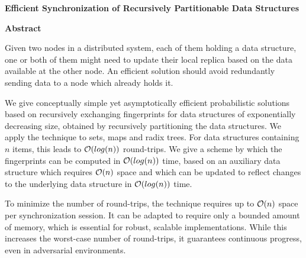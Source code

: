 
\thispagestyle{plain}
\begin{center}
    \Large
    \textbf{Efficient Synchronization of Recursively Partitionable Data Structures}
       
    \vspace{0.9cm}
    \textbf{Abstract}
\end{center}

Given two nodes in a distributed system, each of them holding a data structure, one or both of them might need to update their local replica based on the data available at the other node.
An efficient solution should avoid redundantly sending data to a node which already holds it.

We give conceptually simple yet asymptotically efficient probabilistic solutions based on recursively exchanging fingerprints for data structures of exponentially decreasing size, obtained by recursively partitioning the data structures.
We apply the technique to sets, maps and radix trees.
For data structures containing $n$ items, this leads to $\mathcal{O}(log(n))$ round-trips.
We give a scheme by which the fingerprints can be computed in $\mathcal{O}(log(n))$ time, based on an auxiliary data structure which requires $\mathcal{O}(n)$ space and which can be updated to reflect changes to the underlying data structure in $\mathcal{O}(log(n))$ time.

To minimize the number of round-trips, the technique requires up to $\mathcal{O}(n)$ space per synchronization session.
It can be adapted to require only a bounded amount of memory, which is essential for robust, scalable implementations.
While this increases the worst-case number of round-trips, it guarantees continuous progress, even in adversarial environments.